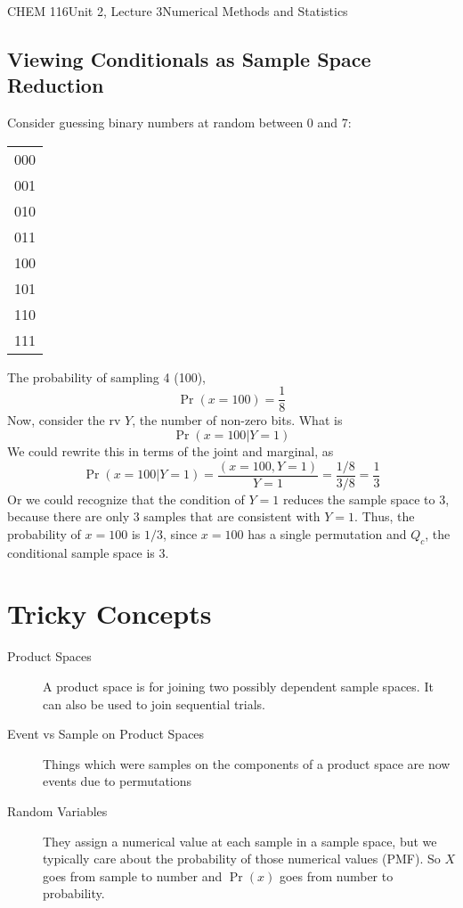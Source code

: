 \documentclass{article}
\begin{document}
\begin{tdoc}{CHEM 116}{Unit 2, Lecture 3}{Numerical Methods and Statistics}
\subsection{Viewing Conditionals as Sample Space Reduction}

Consider guessing binary numbers at random between 0 and 7:\vspace{0.25cm}

\begin{tabular}{l}
000\\
001\\
010\\
011\\
100\\
101\\
110\\
111\\
\end{tabular}\vspace{0.25cm}

The probability of sampling 4 (100),
\[
\Pr(x = 100) = \frac{1}{8}
\]
Now, consider the rv $Y$, the number of non-zero bits. What is
\[
\Pr(x = 100 | Y = 1)
\]
We could rewrite this in terms of the joint and marginal, as
\[
\Pr(x = 100 | Y = 1) = \frac{(x = 100, Y = 1)}{Y = 1} = \frac{1 / 8}{3 / 8} = \frac{1}{3}
\]
Or we could recognize that the condition of $Y = 1$ reduces the sample
space to 3, because there are only 3 samples that are consistent with
$Y = 1$. Thus, the probability of $x = 100$ is $1/3$, since $x = 100$
has a single permutation and $Q_c$, the conditional sample space is
$3$.

\section{Tricky Concepts}

\begin{description}

\item[Product Spaces] A product space is for joining two possibly
  dependent sample spaces. It can also be used to join sequential trials.

\item[Event vs Sample on Product Spaces] Things which were samples on
  the components of a product space are now events due to permutations

\item[Random Variables] They assign a numerical value at each sample
  in a sample space, but we typically care about the probability of
  those numerical values (PMF). So $X$ goes from sample to number and
  $\Pr(x)$ goes from number to probability.


\end{description}
\end{tdoc}
\end{document}
